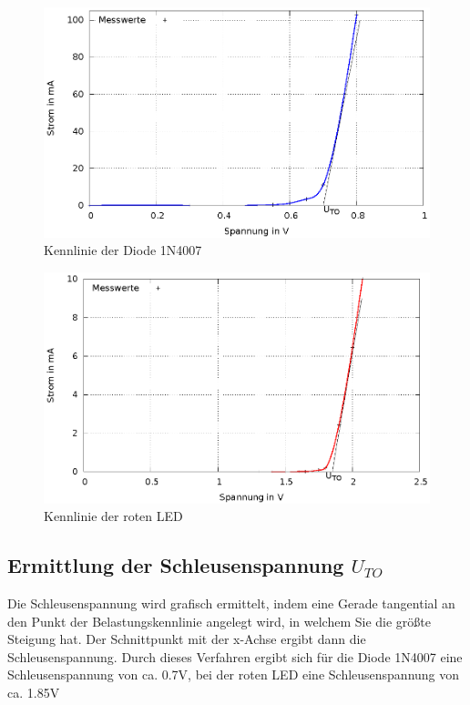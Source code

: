 \documentclass[
a4paper,     %
 headsepline, %
11pt         %
]{scrartcl}  %
\begin{document}
\begin{figure}[hbtp]
\centering
\includegraphics[scale=1]{kennlinie_diode.eps}
\caption{Kennlinie der Diode 1N4007}
\end{figure}

\begin{figure}[hbtp]
\centering
\includegraphics[scale=1]{kennlinie_led.eps}
\caption{Kennlinie der roten LED}
\end{figure}
\newpage

\subsection{Ermittlung der Schleusenspannung $U_{TO}$}

Die Schleusenspannung wird grafisch ermittelt, indem eine Gerade tangential an den Punkt der Belastungskennlinie angelegt wird, in welchem Sie die größte Steigung hat. Der Schnittpunkt mit der x-Achse ergibt dann die Schleusenspannung.
Durch dieses Verfahren ergibt sich für die Diode 1N4007 eine Schleusenspannung von ca. 0.7V, bei der roten LED eine Schleusenspannung von ca. 1.85V
\end{document}
